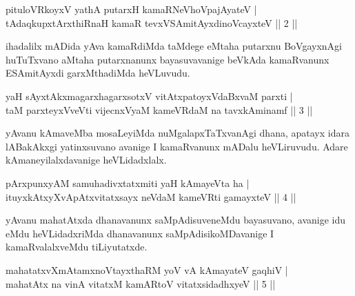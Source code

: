 
\begin{shl}
pituloVRkoyxV yathA putarxH kamaRNeVhoVpajAyateV | \\
tAdaqkupxtArxthiRnaH kamaR tevxVSAmitAyxdinoVcayxteV \hfill|| 2 || 
\end{shl}

\begin{artha}
ihadalilx mADida yAva kamaRdiMda taMdege eMtaha putarxnu BoVgayxnAgi huTuTxvano aMtaha putarxnanunx bayasuvavanige beVkAda kamaRvanunx ESAmitAyxdi garxMthadiMda heVLuvudu.
\end{artha}


\begin{shl}
yaH sAyxtAkxmagarxhagarxsotxV vitAtxpatoyxVdaBxvaM parxti | \\
taM parxteyxVveVti vijecnxVyaM kameVRdaM na tavxkAminamf \hfill|| 3 || 
\end{shl}

\begin{artha}
yAvanu kAmaveMba mosaLeyiMda nuMgalapxTaTxvanAgi dhana, apatayx idara lABakAkxgi yatinxsuvano avanige I kamaRvanunx mADalu heVLiruvudu. Adare kAmaneyilalxdavanige heVLidadxlalx.
\end{artha}


\begin{shl}
pArxpunxyAM samuhadivxtatxmiti yaH kAmayeVta ha | \\
ituyxkAtxyX\s vApAtxvitatxsayx neVdaM kameVRti gamayxteV \hfill|| 4 || 
\end{shl}

\begin{artha}
yAvanu mahatAtxda dhanavanunx saMpAdisuveneMdu bayasuvano, avanige idu eMdu heVLidadxriMda dhanavanunx saMpAdisikoMDavanige I kamaRvalalxveMdu tiLiyutatxde.
\end{artha}


\begin{shl}
mahatatxvXmAtamxnoV\s tayxthaRM yoV vA kAmayateV gaqhiV | \\
mahatAtx na vinA vitatxM kamARtoV vitatxsidadhxyeV \hfill|| 5 || 
\end{shl}

